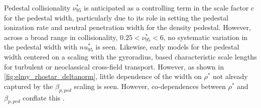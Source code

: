 Pedestal collisionality $\nu^*_{95}$ is anticipated as a controlling term in the scale factor $c$ for the pedestal width, particularly due to its role in setting the pedestal ionization rate and neutral penetration width for the density pedestal.  However, across a broad range in collisionality, $0.25 < \nu^*_{95} < 6$, no systematic variation in the pedestal width with $nu^*_{95}$ is seen.  Likewise, early models for the pedestal width centered on a scaling with the gyroradius, based characteristic scale lengths for turbulent or neoclassical cross-field transport.  However, as shown in \cref{fig:elmy_rhostar_deltanorm}, little dependence of the width on $\rho^*$ not already captured by the $\beta_{p,ped}$ scaling is seen.  However, co-dependences between $\rho^*$ and $\beta_{p,ped}$ conflate this .

\begin{figure}
 \pushtooutside
\end{figure}

